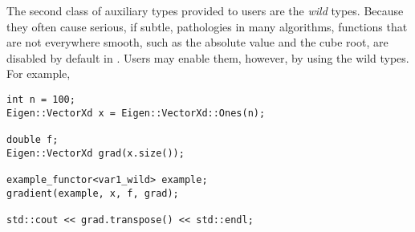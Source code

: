 The second class of auxiliary types provided to users are the \textit{wild}
types.  Because they often cause serious, if subtle, pathologies in many
algorithms, functions that are not everywhere smooth, such as the absolute
value and the cube root, are disabled by default in \nomad.  Users may
enable them, however, by using the wild types.  For example,
%
\begin{verbatim}
int n = 100;
Eigen::VectorXd x = Eigen::VectorXd::Ones(n);
  
double f;
Eigen::VectorXd grad(x.size());
  
example_functor<var1_wild> example;
gradient(example, x, f, grad);

std::cout << grad.transpose() << std::endl;
\end{verbatim}
